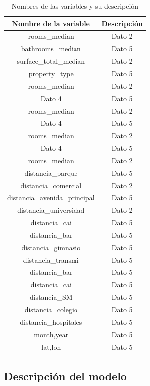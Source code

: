 \documentclass[
  11pt,
  letterpaper,
]{article}
\begin{document}
\begin{table}[ht]
\centering
\caption{Nombres de las variables y su descripción}
\begin{tabular}{|c|c|}
\hline
Nombre de la variable & Descripción  \\
\hline
rooms_median & Dato 2  \\
\hline
bathrooms_median & Dato 5 \\
\hline
surface_total_median & Dato 2  \\
\hline
property_type & Dato 5 \\
\hline
\hline
rooms_median & Dato 2  \\
\hline
Dato 4 & Dato 5 \\
\hline
\hline
rooms_median & Dato 2  \\
\hline
Dato 4 & Dato 5 \\
\hline
\hline
rooms_median & Dato 2  \\
\hline
Dato 4 & Dato 5 \\
\hline
\hline
rooms_median & Dato 2  \\
\hline
distancia_parque & Dato 5 \\
\hline
\hline
distancia_comercial & Dato 2  \\
\hline
distancia_avenida_principal & Dato 5 \\
\hline
\hline
distancia_universidad & Dato 2  \\
\hline
distancia_cai & Dato 5 \\
\hline
distancia_bar & Dato 5 \\
\hline
distancia_gimnasio & Dato 5 \\
\hline
distancia_transmi & Dato 5 \\
\hline
distancia_bar & Dato 5 \\
\hline
distancia_cai & Dato 5 \\
\hline
distancia_SM & Dato 5 \\
\hline
distancia_colegio & Dato 5 \\
\hline
distancia_hospitales & Dato 5 \\
\hline
month,year & Dato 5 \\
\hline
lat,lon & Dato 5 \\
\hline
\end{tabular}
\end{table}

\hypertarget{descripciuxf3n-del-modelo}{%
\subsection{Descripción del modelo}\label{descripciuxf3n-del-modelo}}
\end{document}
